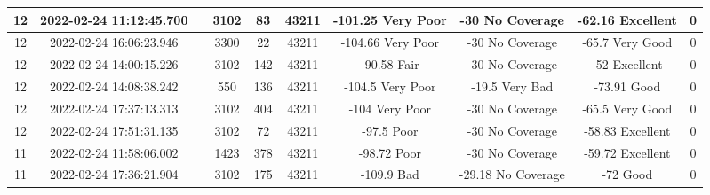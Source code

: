 \begin{longtable*}{|c|c|c|c|c|c|c|c|c|c|}
12&2022-02-24 11:12:45.700&&3102&83&43211& -101.25   Very Poor   & -30       No Coverage & -62.16    Excellent   & 0\\\hline
{}12&2022-02-24 16:06:23.946&&3300&22&43211& -104.66   Very Poor   & -30       No Coverage & -65.7     Very Good   & 0\\\hline
{}12&2022-02-24 14:00:15.226&&3102&142&43211& -90.58    Fair        & -30       No Coverage & -52       Excellent   & 0\\\hline
{}12&2022-02-24 14:08:38.242&&550&136&43211& -104.5    Very Poor   & -19.5     Very Bad    & -73.91    Good        & 0\\\hline
{}12&2022-02-24 17:37:13.313&&3102&404&43211& -104      Very Poor   & -30       No Coverage & -65.5     Very Good   & 0\\\hline
{}12&2022-02-24 17:51:31.135&&3102&72&43211& -97.5     Poor        & -30       No Coverage & -58.83    Excellent   & 0\\\hline
{}11&2022-02-24 11:58:06.002&&1423&378&43211& -98.72    Poor        & -30       No Coverage & -59.72    Excellent   & 0\\\hline
{}11&2022-02-24 17:36:21.904&&3102&175&43211& -109.9    Bad         & -29.18    No Coverage & -72       Good        & 0\\\hline

\end{longtable*}
